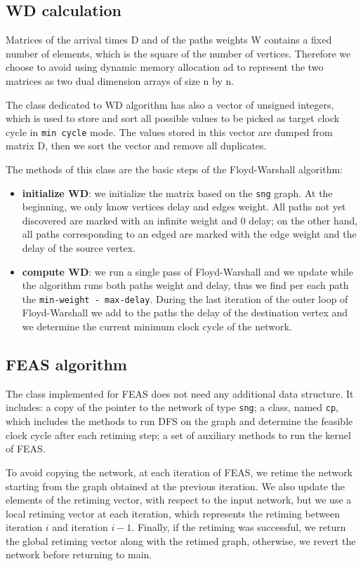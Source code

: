 \documentclass{acm_proc_article-sp}
\begin{document}
\subsection{WD calculation}

Matrices of the arrival times D and of the paths weights W contains a fixed
number of elements, which is the square of the number of vertices. Therefore
we choose to avoid using dynamic memory allocation ad to represent the two
matrices as two dual dimension arrays of size n by n.

The class dedicated to WD algorithm has also a vector of unsigned integers,
which is used to store and sort all possible values to be picked as target
clock cycle in \texttt{min cycle} mode. The values stored in this vector
are dumped from matrix D, then we sort the vector and remove all duplicates.

The methods of this class are the basic steps of the Floyd-Warshall algorithm:
\begin{itemize}
  \item {\bf initialize WD}: we initialize the matrix based on the \texttt{sng}
    graph. At the beginning, we only know vertices delay and edges weight.
    All paths not yet discovered are marked with an infinite weight and 0 delay;
    on the other hand, all paths corresponding to an edged are marked with the
    edge weight and the delay of the source vertex.
  \item {\bf compute WD}: we run a single pass of Floyd-Warshall \cite{algo} and we
    update while the algorithm runs both paths weight and delay, thus we
    find per each path the \texttt{min-weight - max-delay}.
    During the last iteration of the outer loop of Floyd-Warshall we add to
    the paths the delay of the destination vertex and we determine the
    current minimum clock cycle of the network.
\end{itemize}

\subsection{FEAS algorithm}

The class implemented for FEAS does not need any additional data structure.
It includes: a copy of the pointer to the network of type \texttt{sng};
a class, named \texttt{cp}, which includes the methods to run DFS on the
graph and determine the feasible clock cycle after each retiming step; a
set of auxiliary methods to run the kernel of FEAS.

To avoid copying the network, at each iteration of FEAS, we retime the network
starting from the graph obtained at the previous iteration. We also update the
elements of the retiming vector, with respect to the input network, but we
use a local retiming vector at each iteration, which represents the retiming
between iteration $i$ and iteration $i-1$.
Finally, if the retiming was successful, we return the global retiming vector
along with the retimed graph, otherwise, we revert the network before returning
to main.
\end{document}
